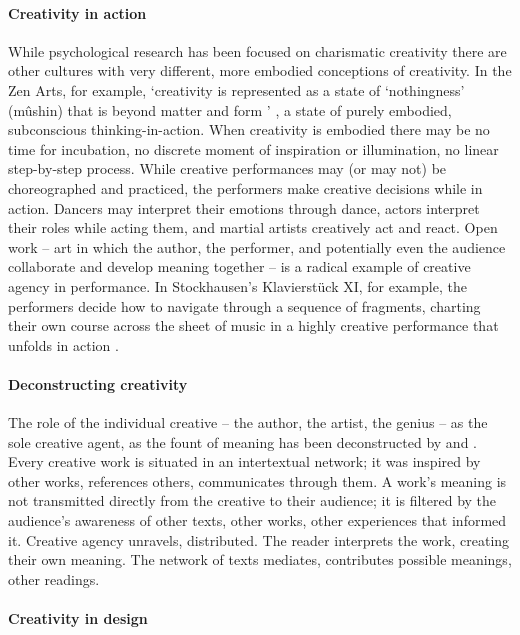 \documentclass{article}
\begin{document}
\paragraph{Creativity in action}
While psychological research has been focused on charismatic creativity
there are other cultures with very different, more embodied conceptions of creativity.
In the Zen Arts, for example, 
`creativity is represented as a state of `nothingness' (m{\^u}shin) that is beyond matter and form ' \citep{Cox2011}, a state of purely embodied, subconscious thinking-in-action.
%
When creativity is embodied there may be no time for incubation, no discrete moment of inspiration or illumination, no linear step-by-step process. 
%
While creative performances may (or may not) be choreographed and practiced, the performers make creative decisions while in action. Dancers may interpret their emotions through dance, actors interpret their roles while acting them, and martial artists creatively act and react. 
%
Open work -- art in which the author, the performer, and potentially even the audience collaborate and develop meaning together -- is a radical example of creative agency in performance.
In Stockhausen's Klavierst{\"u}ck XI, for example, the performers decide 
how to navigate through a sequence of fragments, 
charting their own course across the sheet of music in a highly creative performance that unfolds in action \citep{Eco1989}. 
%

\paragraph{Deconstructing creativity}
The role of the individual creative -- the author, the artist, the genius -- as the sole creative agent, as the fount of meaning
has been deconstructed by \citeauthor{Barthes1977} \citeyearpar{Barthes1977}  and \citeauthor{Foucault1998} \citeyearpar{Foucault1998}. 
%
Every creative work is situated in an intertextual network; 
it was inspired by other works, references others, communicates through them.
A work's meaning is not transmitted directly from the creative to their audience; it is filtered by the audience's awareness of other texts, other works, other experiences that informed it. Creative agency unravels, distributed. 
The reader interprets the work, creating their own meaning.  
The network of texts mediates, contributes possible meanings, other readings.

\paragraph{Creativity in design}
\end{document}
